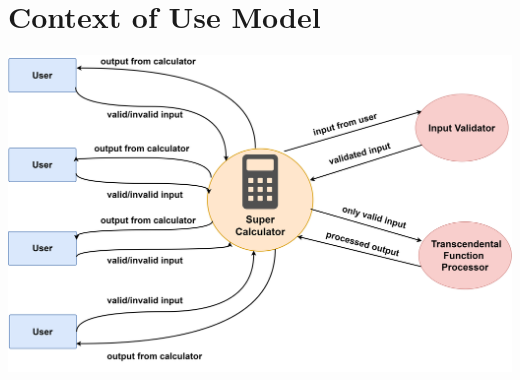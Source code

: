 \documentclass[a4paper, 11pt]{report}
\begin{document}
\section*{Context of Use Model}
\begin{center}
\includegraphics[width=15cm]{context_diagram}
\end{center}
\end{document}
